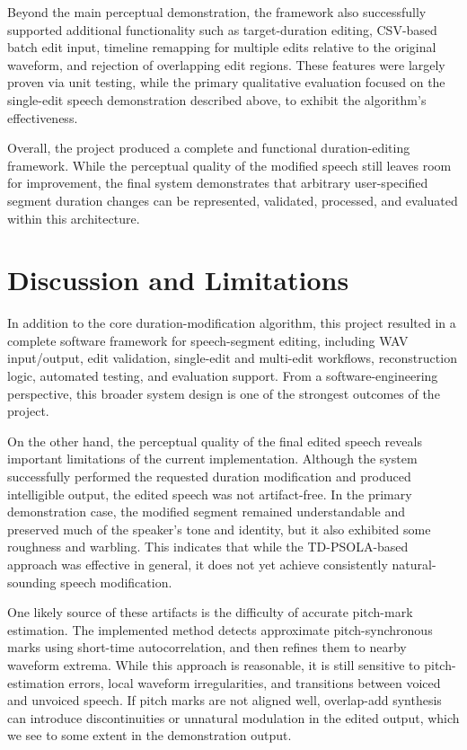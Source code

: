 \documentclass{article}
\begin{document}
Beyond the main perceptual demonstration, the framework also successfully supported additional functionality such as target-duration editing, CSV-based batch edit input, timeline remapping for multiple edits relative to the original waveform, and rejection of overlapping edit regions. These features were largely proven via unit testing, while the primary qualitative evaluation focused on the single-edit speech demonstration described above, to exhibit the algorithm's effectiveness.

Overall, the project produced a complete and functional duration-editing framework. While the perceptual quality of the modified speech still leaves room for improvement, the final system demonstrates that arbitrary user-specified segment duration changes can be represented, validated, processed, and evaluated within this architecture.

\section{Discussion and Limitations}

In addition to the core duration-modification algorithm, this project resulted in a complete software framework for speech-segment editing, including WAV input/output, edit validation, single-edit and multi-edit workflows, reconstruction logic, automated testing, and evaluation support. From a software-engineering perspective, this broader system design is one of the strongest outcomes of the project.

On the other hand, the perceptual quality of the final edited speech reveals important limitations of the current implementation. Although the system successfully performed the requested duration modification and produced intelligible output, the edited speech was not artifact-free. In the primary demonstration case, the modified segment remained understandable and preserved much of the speaker’s tone and identity, but it also exhibited some roughness and warbling. This indicates that while the TD-PSOLA-based approach was effective in general, it does not yet achieve consistently natural-sounding speech modification.

One likely source of these artifacts is the difficulty of accurate pitch-mark estimation. The implemented method detects approximate pitch-synchronous marks using short-time autocorrelation, and then refines them to nearby waveform extrema. While this approach is reasonable, it is still sensitive to pitch-estimation errors, local waveform irregularities, and transitions between voiced and unvoiced speech. If pitch marks are not aligned well, overlap-add synthesis can introduce discontinuities or unnatural modulation in the edited output, which we see to some extent in the demonstration output.
\end{document}
